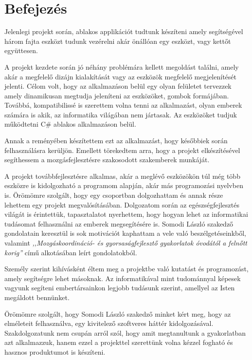 \documentclass[tocnopagenum]{thesis-ekf}
\theoremstyle{definition}
\theoremstyle{remark}
\begin{document}
	\chapter*{Befejezés}
	Jelenlegi projekt során, ablakos applikációt tudtunk készíteni amely segítségével három fajta eszközt tudunk vezérelni akár önállóan egy eszközt, vagy kettőt együttesen.  
	\par
	A projekt kezdete során jó néhány problémára kellett megoldást találni, amely akár a megfelelő dizájn kialakítását vagy az eszközök megfelelő megjelenítését jelenti. Célom volt, hogy az alkalmazáson belül egy olyan felületet tervezzek amely dinamikusan megtudja jeleníteni az eszközöket, gombok formájában. Továbbá, kompatibilissé is szerettem volna tenni az alkalmazást, olyan emberek számára is akik, az informatika világában nem jártasak. Az eszközöket tudjuk működtetni C\# ablakos alkalmazáson belül.
	\par
	Annak a reményében készítettem ezt az alkalmazást, hogy későbbiek során felhasználásra kerüljön. Emellett törekedtem arra, hogy a projekt elkészítésével segíthessem a mozgásfejlesztésre szakosodott szakemberek munkáját.
	\par
	A projekt továbbfejlesztésre alkalmas, akár a meglévő eszközökön túl még több eszközre is kidolgozható a programom alapján, akár más programozási nyelvben is.
	Örömömre szolgált, hogy egy csoportban dolgozhattam és annak része lehettem egy projekt megvalósításában. Dolgozatom során az egészségfejlesztés világát is érintettük, tapasztalatot nyerhettem, hogy hogyan lehet az informatikai tudásomat felhasználni az emberek megsegítésére is. Somodi László szakedző gondolatain keresztül is sok motivációt kaphattam a vele való beszélgetéseinkből, valamint \textit{,,Mozgáskoordináció- és gyorsaságfejlesztő gyakorlatok óvodától a felnőtt korig''} című alkotásában leírt gondolatokból.
	
	Személy szerint kihívásként éltem meg a projektbe való kutatást és programozást, amely segítségre lehet másoknak. Az informatikával mint tudománnyal képesek vagyunk segíteni embertársainkon legjobb tudásunk szerint, amellyel az Isten megáldott bennünket.
	
	Örömömre szolgált, hogy Somodi László szakedző minket kért meg, hogy az elméleteit felhasználva, egy kivitelező szoftveres háttér kidolgozásával. Szakdolgozatunk nem csupán arról szól, hogy amit megtanultunk a gyakorlatban azt alkalmazzuk, hanem ezzel a projekttel szerettünk volna kézzel fogható és hasznos produktumot is készíteni.
	
\end{document}
